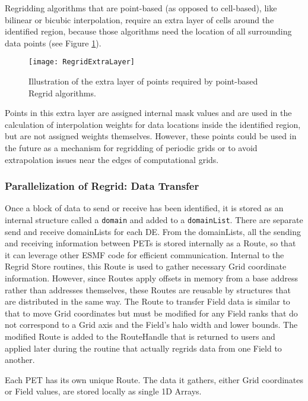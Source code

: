Regridding algorithms that are point-based (as opposed to cell-based), like
bilinear or bicubic interpolation, require an extra layer of cells around the
identified region, because those algorithms need the location of all surrounding
data points (see Figure \ref{fig:RegridExtraLayer}).

\begin{center}
\begin{figure} 
\caption{Illustration of the extra layer of points required by point-based Regrid
         algorithms. }
\label{fig:RegridExtraLayer}
\resizebox{\textwidth}{!}
  {\texttt{[image: RegridExtraLayer]}}
\end{figure}
\end{center}

Points in this extra layer are assigned internal mask values and are used in the
calculation of interpolation weights for data locations inside the identified
region, but are not assigned weights themselves.  However, these points could be
used in the future as a mechanism for regridding of periodic grids or to avoid
extrapolation issues near the edges of computational grids.

\subsubsection{Parallelization of Regrid: Data Transfer}
Once a block of data to send or receive has been identified, it is stored as an
internal structure called a {\tt domain} and added to a {\tt domainList}.  There
are separate send and receive domainLists for each DE.  From the domainLists,
all the sending and receiving information between PETs is stored internally as a
Route, so that it can leverage other ESMF code for efficient communication.
Internal to the Regrid Store routines, this Route is used to gather necessary
Grid coordinate information.  However, since Routes apply offsets in memory from
a base address rather than addresses themselves, these Routes are reusable by
structures that are distributed in the same way.  The Route to transfer Field
data is similar to that to move Grid coordinates but must be modified for any
Field ranks that do not correspond to a Grid axis and the Field's halo width and
lower bounds.   The modified Route is added to the RouteHandle that is returned
to users and applied later during the routine that actually regrids data from
one Field to another.

Each PET has its own unique Route.  The data it gathers, either Grid coordinates
or Field values, are stored locally as single 1D Arrays.


